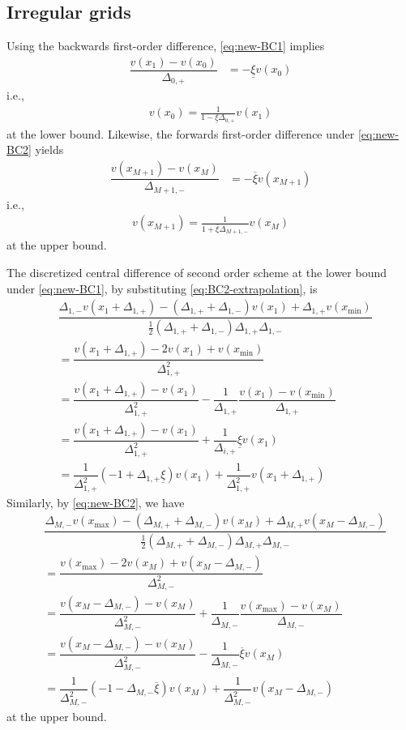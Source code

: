 \documentclass[11pt]{article}
\theoremstyle{definition}
\begin{document}
\subsection{Irregular grids}
Using the backwards first-order difference, \eqref{eq:new-BC1} implies
\begin{align}
\dfrac{v({x_{1}}) - v(x_{0})}{\Delta_{0,+}} &= - \underline{\xi} v({x_{0}})
\end{align}
i.e.,
\begin{align}\label{eq:BC1-extrapolation}
v(x_0) = \frac{1}{1-\underline{\xi} \Delta_{0,+} } v(x_1)
\end{align}
at the lower bound. Likewise, the forwards first-order difference under \eqref{eq:new-BC2} yields
\begin{align}
\dfrac{v(x_{M+1}) - v( {x_{M}})}{\Delta_{M+1,-}} &= - \overline{\xi} v({x_{M+1}})
\end{align}
i.e.,
\begin{align}\label{eq:BC2-extrapolation}
v(x_{M+1}) = \frac{1}{1+\overline{\xi} \Delta_{M+1,-} } v(x_M)
\end{align}
at the upper bound.

The discretized central difference of second order scheme at the lower bound under \eqref{eq:new-BC1}, by substituting \eqref{eq:BC2-extrapolation}, is 
\begin{align}
&\dfrac{\Delta_{1,-} v( {x_{1}} + \Delta_{1,+}) - (\Delta_{1,+} + \Delta_{1,-}) v({x_{1}}) + \Delta_{1,+}  v( x_{\min})}{\frac{1}{2}(\Delta_{1,+} + \Delta_{1,-}) \Delta_{1,+} \Delta_{1,-} } \\
&=
\dfrac{v ({x_{1}}+\Delta_{1, +}) - 2 v({x_{1}}) + v(x_{\min})}{\Delta_{1, +}^2} \\ 
&= \dfrac{v({x_{1}} + \Delta_{1, +}) - v({x_{1}})}{\Delta_{1, +}^2} - \dfrac{1}{\Delta_{1, +}}\dfrac{v({x_{1}}) - v(x_{\min}) }{\Delta_{1, +}}  \\
&= \dfrac{v({x_{1}} + \Delta_{1, +}) - v({x_{1}})}{\Delta_{1, +}^2} + \dfrac{1}{\Delta_{i,+}} \underline{\xi} v({x_{1}})  \\ 
&= \dfrac{1}{\Delta_{1, +}^2}  (- 1 + \Delta_{1, +} \underline{\xi}) v({x_{1}})  + \dfrac{1}{\Delta_{1, +}^2}  v({x_{1}} + \Delta_{1, +})  
\end{align}
Similarly, by \eqref{eq:new-BC2}, we have
\begin{align}
&\dfrac{\Delta_{M,-} v( x_{\max}) - (\Delta_{M,+} + \Delta_{M,-}) v({x_{M}} ) + \Delta_{M,+}  v( {x_{M}} - \Delta_{M,-})}{\frac{1}{2}(\Delta_{M,+} + \Delta_{M,-}) \Delta_{M,+} \Delta_{M,-} } \\
&=\dfrac{v(x_{\max}) - 2 v({x_{M}} ) + v({x_{M}} -\Delta_{M,-})}{\Delta_{M,-}^2} \\
&=   \dfrac{v({x_{M}} - \Delta_{M,-}) - v({x_{M}})}{\Delta_{M,-}^2} + \dfrac{1}{\Delta_{M,-}}\dfrac{ v(x_{\max}) - v ({x_{M}}) }{\Delta_{M,-}}  \\
&= \dfrac{v({x_{M}} - \Delta_{M,-}) - v({x_{M}})}{\Delta_{M,-}^2}  - \dfrac{1}{\Delta_{M,-}} \overline{\xi} v({x_{M}})  \\ 
&= \dfrac{1}{\Delta_{M,-}^2}  (- 1 - \Delta_{M,-} \overline{\xi}) v({x_{M}})  + \dfrac{1}{\Delta_{M,-}^2}  v({x_{M}} - \Delta_{M,-})  
\end{align}
at the upper bound.
\end{document}
